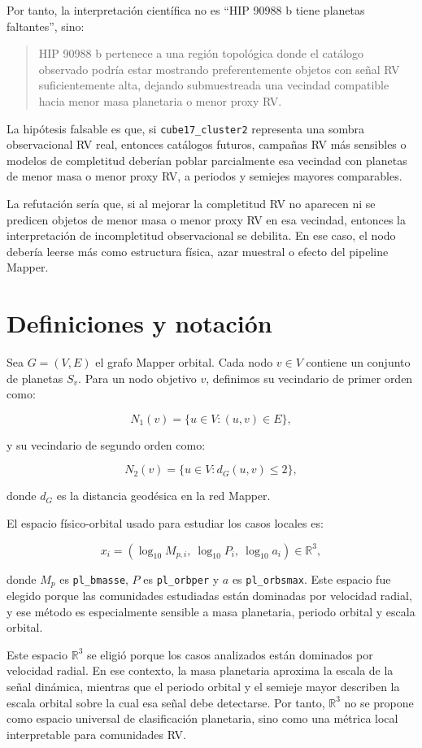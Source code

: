 \documentclass[11pt]{article}
\begin{document}
Por tanto, la interpretación científica no es ``HIP 90988 b tiene planetas faltantes'', sino:

\begin{quote}
HIP 90988 b pertenece a una región topológica donde el catálogo observado podría estar mostrando preferentemente objetos con señal RV suficientemente alta, dejando submuestreada una vecindad compatible hacia menor masa planetaria o menor proxy RV.
\end{quote}


La hipótesis falsable es que, si \texttt{cube17\_cluster2} representa una sombra observacional RV real, entonces catálogos futuros, campañas RV más sensibles o modelos de completitud deberían poblar parcialmente esa vecindad con planetas de menor masa o menor proxy RV, a periodos y semiejes mayores comparables.

La refutación sería que, si al mejorar la completitud RV no aparecen ni se predicen objetos de menor masa o menor proxy RV en esa vecindad, entonces la interpretación de incompletitud observacional se debilita. En ese caso, el nodo debería leerse más como estructura física, azar muestral o efecto del pipeline Mapper.

\section{Definiciones y notación}

Sea $G=(V,E)$ el grafo Mapper orbital. Cada nodo $v\in V$ contiene un conjunto de planetas $S_v$. Para un nodo objetivo $v$, definimos su vecindario de primer orden como:

\[
N_1(v)=\{u\in V:(u,v)\in E\},
\]

y su vecindario de segundo orden como:

\[
N_2(v)=\{u\in V:d_G(u,v)\leq 2\},
\]

donde $d_G$ es la distancia geodésica en la red Mapper.

El espacio físico-orbital usado para estudiar los casos locales es:

\[
x_i=
\left(
\log_{10}M_{p,i},\
\log_{10}P_i,\
\log_{10}a_i
\right)
\in \mathbb{R}^3,
\]

donde $M_p$ es \texttt{pl\_bmasse}, $P$ es \texttt{pl\_orbper} y $a$ es \texttt{pl\_orbsmax}. Este espacio fue elegido porque las comunidades estudiadas están dominadas por velocidad radial, y ese método es especialmente sensible a masa planetaria, periodo orbital y escala orbital.

Este espacio $\mathbb{R}^3$ se eligió porque los casos analizados están dominados por velocidad radial. En ese contexto, la masa planetaria aproxima la escala de la señal dinámica, mientras que el periodo orbital y el semieje mayor describen la escala orbital sobre la cual esa señal debe detectarse. Por tanto, $\mathbb{R}^3$ no se propone como espacio universal de clasificación planetaria, sino como una métrica local interpretable para comunidades RV.
\end{document}
